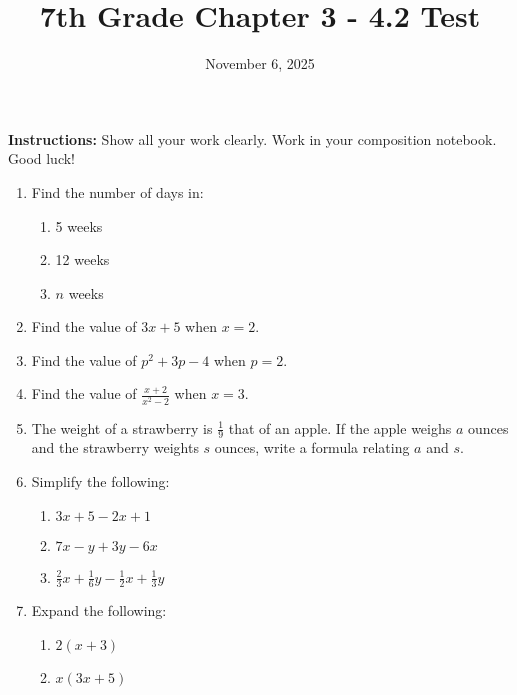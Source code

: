 \documentclass[11pt]{article}
\title{7th Grade Chapter 3 - 4.2 Test}
\date{November 6, 2025}
\begin{document}
\maketitle

\textbf{Instructions:} Show all your work clearly.  Work in your composition notebook.  Good luck!

\begin{enumerate}
    \item Find the number of days in:
    \begin{enumerate}
        \item 5 weeks
        \item 12 weeks
        \item $n$ weeks
    \end{enumerate}
    \item Find the value of $3x+5$ when $x=2$.
    \item Find the value of $p^2+3p-4$ when $p=2$.
    \item Find the value of $\frac{x+2}{x^2-2}$ when $x=3$.
    \item The weight of a strawberry is $\frac{1}{9}$ that of an apple. If the apple weighs $a$ ounces and the strawberry weights $s$ ounces, write a formula relating $a$ and $s$.
    \item Simplify the following:
    \begin{enumerate}
        \item $3x + 5 - 2x + 1$
        \item $7x-y+3y-6x$
        \item $\frac{2}{3}x + \frac{1}{6}y - \frac{1}{2}x + \frac{1}{3}y$
    \end{enumerate}
    \item Expand the following:
    \begin{enumerate}
        \item $2(x+3)$
        \item $x(3x+5)$
    \end{enumerate}
\end{enumerate}
\end{document}
